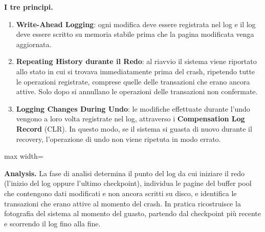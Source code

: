 \documentclass[12pt]{extarticle}
\begin{document}
\medskip
\noindent \textbf{I tre principi.}
\begin{enumerate}
    \item \textbf{Write-Ahead Logging}: ogni modifica deve essere registrata nel log e il log deve essere scritto su memoria stabile prima che la pagina modificata venga aggiornata.
    \item \textbf{Repeating History durante il Redo}: al riavvio il sistema viene riportato allo stato in cui si trovava immediatamente prima del crash, ripetendo tutte le operazioni registrate, comprese quelle delle transazioni che erano ancora attive. Solo dopo si annullano le operazioni delle transazioni non confermate.
    \item \textbf{Logging Changes During Undo}: le modifiche effettuate durante l'undo vengono a loro volta registrate nel log, attraverso i \textbf{Compensation Log Record} (CLR). In questo modo, se il sistema si guasta di nuovo durante il recovery, l'operazione di undo non viene ripetuta in modo errato.
\end{enumerate}

\begin{center}
\begin{adjustbox}{max width=\linewidth}
\end{adjustbox}
\end{center}

\medskip
\noindent \textbf{Analysis.} La fase di analisi determina il punto del log da cui iniziare il redo (l'inizio del log oppure l'ultimo checkpoint), individua le pagine del buffer pool che contengono dati modificati e non ancora scritti su disco, e identifica le transazioni che erano attive al momento del crash. In pratica ricostruisce la fotografia del sistema al momento del guasto, partendo dal checkpoint più recente e scorrendo il log fino alla fine.
\end{document}
